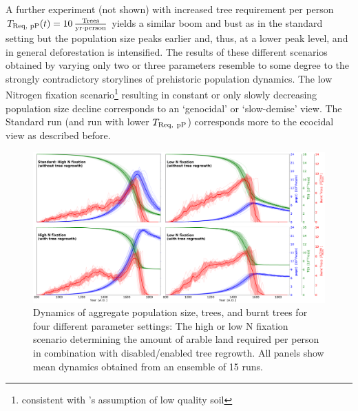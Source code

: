 A further experiment (not shown) with increased tree requirement per person $T_\text{Req, pP}(t)=10\,{\rm \frac{Trees}{yr\cdot person}}$ yields a similar boom and bust as in the standard setting but the population size peaks earlier and, thus, at a lower peak level, and in general deforestation is intensified.
The results of these different scenarios obtained by varying only two or three parameters resemble to some degree to the strongly contradictory storylines of prehistoric population dynamics.
The low Nitrogen fixation scenario\footnote{consistent with \citet{Hunt2007}'s assumption of low quality soil} resulting in constant or only slowly decreasing population size decline corresponds to an `genocidal' \citep{Hunt2007} or `slow-demise' \citep{Brandt2015} view.
The Standard run (and run with lower $T_{\rm Req, \ pP}$) corresponds more to the ecocidal view as described before.



\begin{figure}
	\centering
	\includegraphics[width=1.3\textwidth, center]{images/Results/Standard/EnsembleStatistics_allTheories}
	\caption{Dynamics of aggregate population size, trees, and burnt trees for four different parameter settings: The high or low N fixation scenario determining the amount of arable land required per person in combination with disabled/enabled tree regrowth.
		All panels show mean dynamics obtained from an ensemble of 15 runs.}
	\label{fig:ensemblestatisticsalltheories}
\end{figure}

